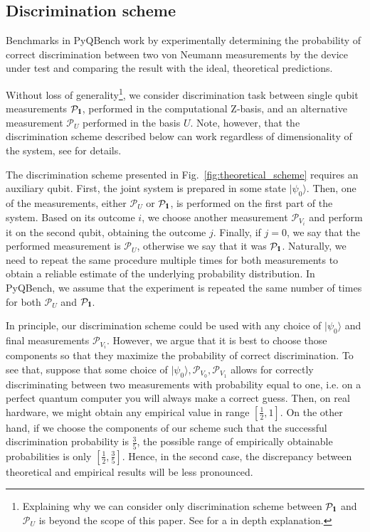 \documentclass[preprint,12pt, a4paper, dvipsnames]{elsarticle}
\newcommand{\ket}[1]{\ensuremath{|#1\rangle}}
\newcommand{\1}{{\rm 1\hspace{-0.9mm}l}}
\newcommand{\Id}{{\rm 1\hspace{-0.9mm}l}}
\newcommand{\PP}{\mathcal{P}}
\theoremstyle{definition}
\begin{document}
\subsection{Discrimination scheme}\label{sec:discrimination-scheme}

Benchmarks in PyQBench work by experimentally determining the probability of correct discrimination
between two von Neumann measurements by the device under test and comparing the result with the
ideal, theoretical predictions.

Without loss of generality\footnote{Explaining why we can consider only discrimination scheme
between $\PP_{\Id}$ and $\PP_{U}$ is beyond the scope of this paper. See
\cite{puchala2018strategies} for a in depth explanation.}, we consider discrimination task between
single qubit measurements $\PP_\Id$, performed in the computational Z-basis, and an alternative
measurement $\PP_U$ performed in the basis $U$. Note, however, that the discrimination scheme
described below can work regardless of dimensionality of the system, see
\cite{puchala2018strategies} for details.

The discrimination scheme presented in Fig.~\ref{fig:theoretical_scheme} requires an
auxiliary qubit. First, the joint system is prepared in some state $\ket{\psi_0}$. Then, one of the
measurements, either $\PP_U$ or $\PP_\1$, is performed on the first part of the system. Based on its
outcome $i$, we choose another measurement $\mathcal{P}_{V_i}$ and perform it on the second qubit,
obtaining the outcome $j$. Finally, if $j=0$, we say that the performed measurement is
$\mathcal{P}_U$, otherwise we say that it was $\mathcal{P}_\Id$. Naturally, we need to repeat the
same procedure multiple times for both measurements to obtain a reliable estimate of the underlying
probability distribution. In PyQBench, we assume that the experiment is repeated the same number of
times for both $\PP_U$ and $\PP_\Id$.

In principle, our discrimination scheme could be used with any choice of
$\ket{\psi_0}$ and final measurements $\PP_{V_i}$. However, we argue that it is best to choose those
components so that they maximize the probability of correct discrimination. To see that,
suppose that some choice of $\ket{\psi_0}, \PP_{V_0}, \PP_{V_1}$ allows for correctly discriminating
between two measurements with probability equal to one, i.e. on a perfect quantum computer you will always
make a correct guess. Then, on real hardware, we might obtain any empirical value in range $\left[\frac{1}{2},
1\right]$. On the other hand, if we choose the components of our scheme such that the successful
discrimination probability is $\frac{3}{5}$, the possible range of empirically obtainable probabilities
is only $\left[\frac{1}{2}, \frac{3}{5}\right]$. Hence, in the second case, the discrepancy between theoretical and empirical
results will be less pronounced.
\end{document}
